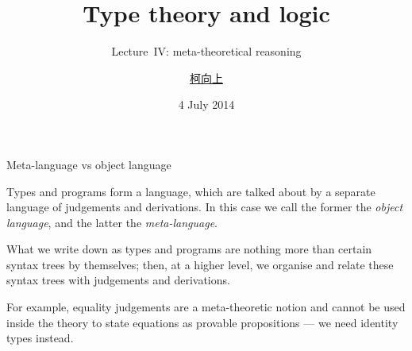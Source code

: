 \documentclass[t,compress,hyperref={hidelinks}]{beamer}
\newcommand{\lectureno}{IV}
\begin{document}

\title{Type theory and logic}
\subtitle{Lecture~\lectureno: meta-theoretical reasoning}
\date{4 July 2014}
\author{{\href{http://www.cs.ox.ac.uk/people/hsiang-shang.ko/}{柯向上}}}

{
\begin{frame}
\titlepage
\end{frame}}

\begin{frame}{Meta-language vs object language}

Types and programs form a language, which are talked about by a separate language of judgements and derivations.
In this case we call the former  the \emph{object language}, and the latter the \emph{meta-language}.

What we write down as types and programs are nothing more than certain syntax trees by themselves; then, at a higher level, we organise and relate these syntax trees with judgements and derivations.

For example, equality judgements are a meta-theoretic notion and cannot be used inside the theory to state equations as provable propositions --- we need identity types instead.

\end{frame}
\end{document}

